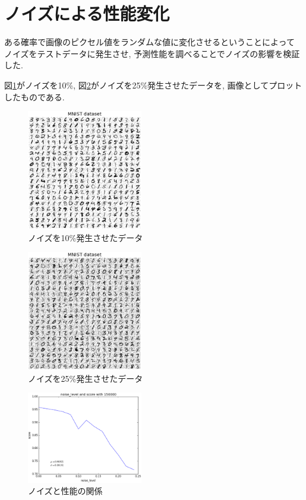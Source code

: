 \documentclass[10pt,a4paper,twocolumn]{jarticle}
\begin{document}
\section{ノイズによる性能変化}
ある確率で画像のピクセル値をランダムな値に変化させるということによって
ノイズをテストデータに発生させ,
予測性能を調べることでノイズの影響を検証した. 

図\ref{fig:noise-0.1}がノイズを10\%,
図\ref{fig:noise-0.25}がノイズを25\%発生させたデータを, 
画像としてプロットしたものである. 

\begin{figure}[htbp]
  \centering
  \includegraphics[width=0.45\textwidth]{assets/img/tiled_mnist_nl0.1.eps}
  \caption{ノイズを10\%発生させたデータ}
  \label{fig:noise-0.1}
\end{figure}
\begin{figure}[htbp]
  \centering
  \includegraphics[width=0.45\textwidth]{assets/img/tiled_mnist_nl0.25.eps}
  \caption{ノイズを25\%発生させたデータ}
  \label{fig:noise-0.25}
\end{figure}

\begin{figure}[htbp]
  \centering
  \includegraphics[width=0.45\textwidth]{assets/img/noise_level_test_mnist_cl0.0.eps}
  \caption{ノイズと性能の関係}
  \label{fig:noise-level-test-cl0.0}
\end{figure}
\end{document}
